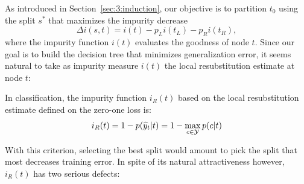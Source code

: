 As introduced in Section~\ref{sec:3:induction}, our objective is to partition
$t_0$ using the split $s^*$ that maximizes the impurity decrease $$\Delta i(s,
t) = i(t) - p_L i(t_L) - p_R i(t_R),$$ where the impurity function $i(t)$ evaluates
the goodness of node $t$. Since our goal is to build the decision tree
that minimizes generalization error, it seems natural to take as impurity
measure $i(t)$ the local resubstitution estimate at node $t$:
\begin{definition}
In classification, the impurity function $i_R(t)$ based on the local resubstitution estimate
defined on the zero-one loss is:
\begin{equation}\label{eqn:impurity:error}
i_R(t) = 1 - p(\widehat{y}_t|t) =  1 - \max_{c \in {\cal Y}} p(c|t)
\end{equation}
\end{definition}
With this criterion, selecting the best split would amount to pick the split that most
decreases training error. In spite of its natural attractiveness however,
$i_R(t)$ has two serious defects:
